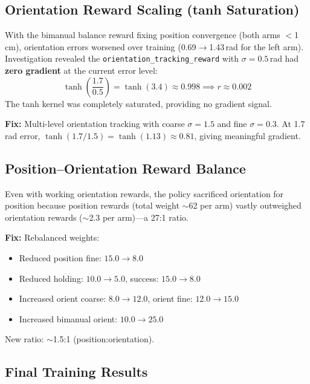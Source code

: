 \documentclass[11pt,a4paper]{article}
\begin{document}
\subsection{Orientation Reward Scaling (tanh Saturation)}
\label{sec:orient_std}
With the bimanual balance reward fixing position convergence (both arms $<$1\,cm), orientation errors worsened over training (0.69$\to$1.43\,rad for the left arm). Investigation revealed the \texttt{orientation\_tracking\_reward} with $\sigma=0.5$\,rad had \textbf{zero gradient} at the current error level:
\begin{equation}
  \tanh\!\left(\frac{1.7}{0.5}\right) = \tanh(3.4) \approx 0.998 \implies r \approx 0.002
\end{equation}
The tanh kernel was completely saturated, providing no gradient signal.

\textbf{Fix:} Multi-level orientation tracking with coarse $\sigma=1.5$ and fine $\sigma=0.3$. At 1.7\,rad error, $\tanh(1.7/1.5)=\tanh(1.13)\approx 0.81$, giving meaningful gradient.

\subsection{Position--Orientation Reward Balance}
\label{sec:balance}
Even with working orientation rewards, the policy sacrificed orientation for position because position rewards (total weight $\sim$62 per arm) vastly outweighed orientation rewards ($\sim$2.3 per arm)---a 27:1 ratio.

\textbf{Fix:} Rebalanced weights:
\begin{itemize}[nosep]
  \item Reduced position fine: $15.0 \to 8.0$
  \item Reduced holding: $10.0 \to 5.0$, success: $15.0 \to 8.0$
  \item Increased orient coarse: $8.0 \to 12.0$, orient fine: $12.0 \to 15.0$
  \item Increased bimanual orient: $10.0 \to 25.0$
\end{itemize}
New ratio: $\sim$1.5:1 (position:orientation).

\subsection{Final Training Results}
\label{sec:final_results}
\end{document}

